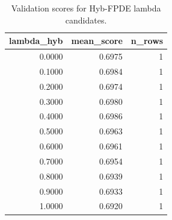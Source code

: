 \begin{table}[t]
\caption{Validation scores for Hyb-FPDE lambda candidates.}
\label{tab:lambda_distribution_computed}
\centering
\begin{tabular}{rrr}
\toprule
lambda\_hyb & mean\_score & n\_rows \\
\midrule
0.0000 & 0.6975 & 1 \\
0.1000 & 0.6984 & 1 \\
0.2000 & 0.6974 & 1 \\
0.3000 & 0.6980 & 1 \\
0.4000 & 0.6986 & 1 \\
0.5000 & 0.6963 & 1 \\
0.6000 & 0.6961 & 1 \\
0.7000 & 0.6954 & 1 \\
0.8000 & 0.6939 & 1 \\
0.9000 & 0.6933 & 1 \\
1.0000 & 0.6920 & 1 \\
\bottomrule
\end{tabular}

\end{table}
